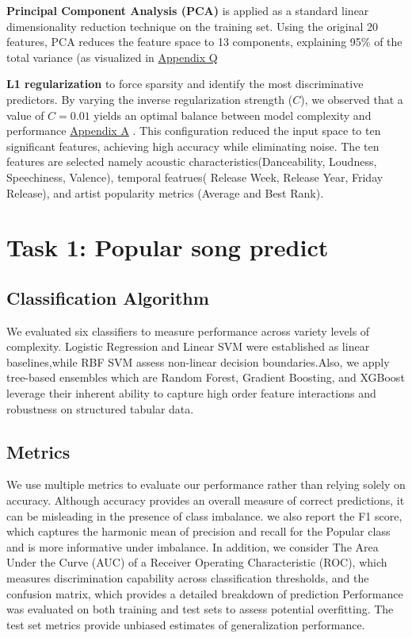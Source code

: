 \documentclass{article}
\begin{document}
{{{\textbf{Principal Component Analysis (PCA)} is applied as a standard linear dimensionality reduction technique on the training set. Using the original 20 features, PCA reduces the feature space to 13 components, explaining 95\% of the total variance (as visualized in \hyperref[fig:PCA]{Appendix Q}


\textbf{L1 regularization} to force sparsity and identify the most discriminative predictors. By varying the inverse regularization strength ($C$), we observed that a value of $C=0.01$ yields an optimal balance between model complexity and performance \hyperref[fig:L1]{Appendix A}
. This configuration reduced the input space to ten significant features, achieving high accuracy while eliminating noise.  The ten features are selected namely  acoustic characteristics(Danceability, Loudness, Speechiness, Valence), temporal featrues( Release Week, Release Year, Friday Release), and artist popularity metrics (Average and Best Rank).



\section{Task 1: Popular song predict}

\subsection{Classification Algorithm}
We evaluated six classifiers to measure performance across variety levels of complexity. Logistic Regression and Linear SVM were established as linear baselines,while RBF SVM  assess non-linear decision boundaries.Also, we apply tree-based ensembles which are Random Forest, Gradient Boosting, and XGBoost leverage their inherent ability to capture high order feature interactions and robustness on structured tabular data.



\subsection{Metrics}
We use multiple metrics to evaluate our performance rather than relying solely on accuracy. Although accuracy provides an overall measure of correct predictions, it can be misleading in the presence of class imbalance. we also report the F1 score, which captures the harmonic mean of precision and recall for the Popular class and is more informative under imbalance. In addition, we consider The Area Under the Curve (AUC) of a Receiver Operating Characteristic (ROC), which measures discrimination capability across classification thresholds, and the confusion matrix, which provides a detailed breakdown of prediction Performance was evaluated on both training and test sets to assess potential overfitting. The test set metrics provide unbiased estimates of generalization performance. 

}}}
\end{document}
